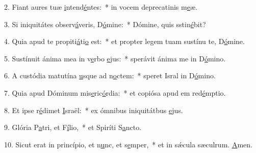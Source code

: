 2. Fiant aures tuæ \uline{i}ntend\uline{é}ntes:~* in vocem deprecatinis m\uline{e}æ.\par 
3. Si iniquitátes observ\uline{á}veris, D\uline{ó}mine:~* Dómine, quis sstin\uline{é}bit?\par 
4. Quia apud te propiti\uline{á}ti\uline{o} est:~* et propter legem tuam sustínu te, D\uline{ó}mine.\par 
5. Sustínuit ánima mea in v\uline{e}rbo \uline{e}jus:~* sperávit ánima me in D\uline{ó}mino.\par 
6. A custódia matutína \uline{u}sque ad n\uline{o}ctem:~* speret Isral in D\uline{ó}mino.\par 
7. Quia apud Dóminum mis\uline{e}ric\uline{ó}rdia:~* et copiósa apud em red\uline{é}mptio.\par 
8. Et ipse r\uline{é}dimet \uline{I}sraël:~* ex ómnibus iniquitátbus \uline{e}jus.\par 
9. Glória P\uline{a}tri, et F\uline{í}lio,~* et Spiríti S\uline{a}ncto.\par 
10. Sicut erat in princípio, et n\uline{u}nc, et s\uline{e}mper,~* et in sǽcula sæculrum. \uline{A}men.\par 
